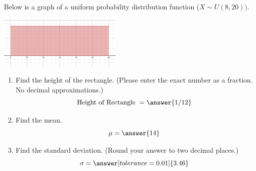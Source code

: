 \documentclass{ximera}
\begin{document}
\begin{problem}\label{prob:140hom4prob6}
Below is a graph of a uniform probability distribution function ($X\sim U(8,20))$.  
\begin{image}
   
\includegraphics[height=1in]{140H4pic3.jpg}~
 
\end{image}
\begin{enumerate}
    \item Find the height of the rectangle. (Please enter the exact number as a fraction.  No decimal approximations.)
    $$\mbox{Height of Rectangle }=\answer{1/12}$$
    \item Find the mean.
    $$\mu=\answer{14}$$
    \item Find the standard deviation. (Round your answer to two decimal places.)
    $$\sigma=\answer[tolerance=0.01]{3.46}$$
\end{enumerate}

\end{problem}
\end{document}
